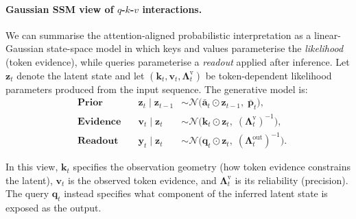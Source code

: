 \documentclass{article}
\begin{document}
\paragraph{Gaussian SSM view of $q$-$k$-$v$ interactions.}
We can summarise the attention-aligned probabilistic interpretation as a linear-Gaussian state-space model in which keys and values parameterise the \emph{likelihood} (token evidence), while queries parameterise a \emph{readout} applied after inference.
Let $\mathbf{z}_t$ denote the latent state and let $(\mathbf{k}_t,\mathbf{v}_t,\boldsymbol{\Lambda}_t^{\mathrm v})$ be token-dependent likelihood parameters produced from the input sequence.
The generative model is:
\begin{align}
& \textbf{Prior}\quad
&\mathbf{z}_t \mid \mathbf{z}_{t-1}
&\sim \mathcal{N}\!\bigl(\bar{\mathbf{a}}_t \odot \mathbf{z}_{t-1},\; \bar{\mathbf{p}}_t\bigr),
\label{eq:gen_dyn_qkv}\\
&\textbf{Evidence}\quad
&\mathbf{v}_t \mid \mathbf{z}_t
&\sim \mathcal{N}\!\bigl(\mathbf{k}_t \odot \mathbf{z}_t,\; (\boldsymbol{\Lambda}_t^{\mathrm v})^{-1}\bigr),
\label{eq:gen_obs_qkv}\\
&\textbf{Readout}\quad
&\mathbf{y}_t \mid \mathbf{z}_t
&\sim \mathcal{N}\!\bigl(\mathbf{q}_t \odot \mathbf{z}_t,\; (\boldsymbol{\Lambda}_t^{\mathrm{out}})^{-1}\bigr).
\label{eq:gen_readout_qkv}
\end{align}

In this view, $\mathbf{k}_t$ specifies the observation geometry (how token evidence constrains the latent), $\mathbf{v}_t$ is the observed token evidence, and $\boldsymbol{\Lambda}_t^{\mathrm v}$ is its reliability (precision).
The query $\mathbf{q}_t$ instead specifies what component of the inferred latent state is exposed as the output.
\end{document}
